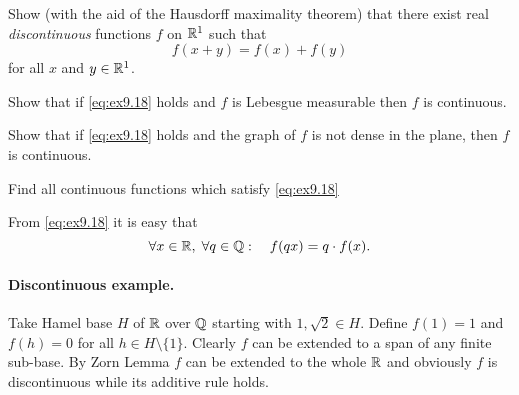 \begin{enumerate}
\begin{excopy}
Show (with the aid of the Hausdorff maximality theorem) that there exist real
\emph{discontinuous} functions $f$ on \(\mathbb{R}^1\) such that 
\begin{equation} \label{eq:ex9.18}
f(x + y) = f(x) + f(y)
\end{equation}
for all $x$ and \(y\in \mathbb{R}^1\).

Show that if \eqref{eq:ex9.18} holds and $f$ is Lebesgue measurable then
$f$ is continuous.

Show that if \eqref{eq:ex9.18} holds and the graph of $f$ is
not dense in the plane, then $f$ is continuous.

Find all continuous functions which satisfy \eqref{eq:ex9.18}
\end{excopy}

From \eqref{eq:ex9.18} it is easy that
\begin{equation} \label{eq:ex9.18:Q}
\forall x\in\mathbb{R},\;\forall q\in\mathbb{Q}:\quad f(qx) = q\cdot f(x).
\end{equation}

\paragraph{Discontinuous example.}
Take 
Hamel base $H$ of \(\mathbb{R}\) over \(\mathbb{Q}\) starting with \(1,\sqrt{2}\in H\).
Define 
\(f(1)=1\) and \(f(h)=0\) for all \(h\in H \setminus\{1\}\).
Clearly $f$ can be extended to a span of any finite sub-base.
By Zorn Lemma $f$ can be extended to the whole \(\mathbb{R}\)
and obviously $f$ is discontinuous while its additive rule holds.


\end{enumerate}
